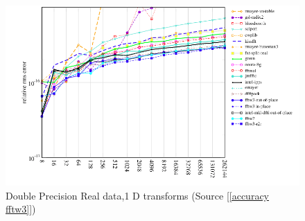 \begin{figure}[!h]
\centering
\includegraphics[scale=0.45]{figures/doublefftw.png}
\caption{Double Precision Real data,1 D transforms (Source [\ref{accuracy fftw3}])}
\label{fig:doublea}
\end{figure}